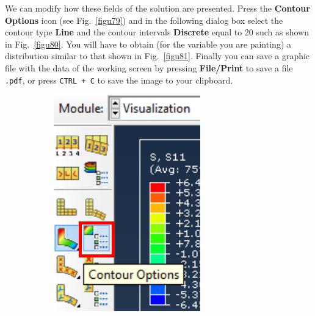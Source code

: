 \begin{enumerate}
  We can modify how these fields of the solution are presented. Press
  the \textbf{Contour Options} icon (see Fig.~\ref{figu79}) and in the
  following dialog box select the contour type \textbf{Line} and the
  contour intervals \textbf{Discrete} equal to 20 such as shown in
  Fig.~\ref{figu80}. You will have to obtain (for the variable you are
  painting) a distribution similar to that shown in
  Fig.~\ref{figu81}. Finally you can save a graphic file with the data
  of the working screen by pressing \textbf{File/Print} to save a file
  \texttt {.pdf}, or press \texttt{CTRL + C} to save the image to your
  clipboard.
  \begin{figure}[H]
    \centering
    \begin{subfigure}{0.19\textwidth}
      \includegraphics[width=\textwidth]{./body/images/imagen79.pdf}

\end{subfigure}
\end{figure}
\end{enumerate}
